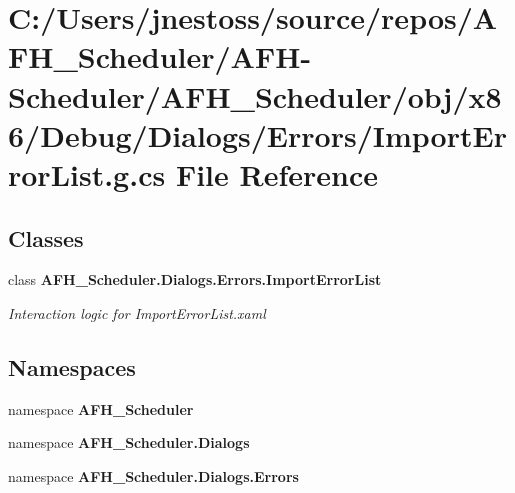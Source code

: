 \section{C\+:/\+Users/jnestoss/source/repos/\+A\+F\+H\+\_\+\+Scheduler/\+A\+F\+H-\/\+Scheduler/\+A\+F\+H\+\_\+\+Scheduler/obj/x86/\+Debug/\+Dialogs/\+Errors/\+Import\+Error\+List.g.\+cs File Reference}
\label{x86_2_debug_2_dialogs_2_errors_2_import_error_list_8g_8cs}
\subsection*{Classes}
\begin{DoxyCompactItemize}
\item 
class \textbf{ A\+F\+H\+\_\+\+Scheduler.\+Dialogs.\+Errors.\+Import\+Error\+List}
\begin{DoxyCompactList}\small\item\em Interaction logic for Import\+Error\+List.\+xaml \end{DoxyCompactList}\end{DoxyCompactItemize}
\subsection*{Namespaces}
\begin{DoxyCompactItemize}
\item 
namespace \textbf{ A\+F\+H\+\_\+\+Scheduler}
\item 
namespace \textbf{ A\+F\+H\+\_\+\+Scheduler.\+Dialogs}
\item 
namespace \textbf{ A\+F\+H\+\_\+\+Scheduler.\+Dialogs.\+Errors}
\end{DoxyCompactItemize}
